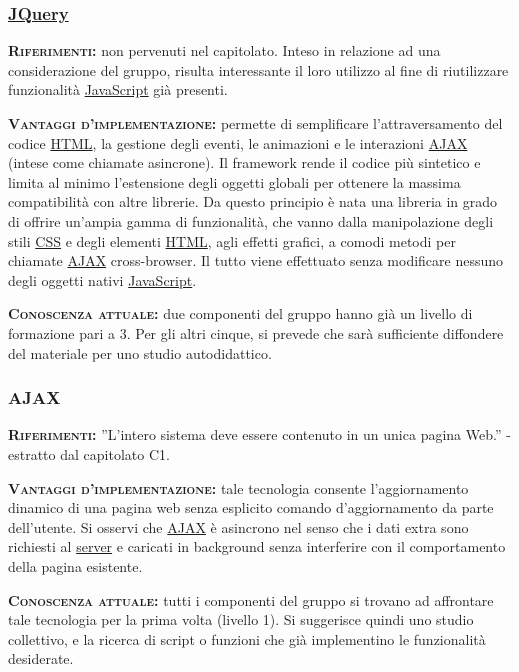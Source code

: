 \subsubsection{\underline{JQuery}}
\begin{description}
	\item{\scshape\bfseries Riferimenti:} non pervenuti nel capitolato. Inteso in relazione ad una considerazione del gruppo, risulta interessante il loro utilizzo al fine di riutilizzare funzionalità \underline{JavaScript} già presenti.
	
	\item{\scshape\bfseries Vantaggi d'implementazione:} permette di semplificare l'attraversamento del codice \underline{HTML}, la gestione degli eventi, le animazioni e le interazioni \underline{AJAX} (intese come chiamate asincrone). Il framework rende il codice più sintetico e limita al minimo l’estensione degli oggetti globali per ottenere la massima compatibilità con altre librerie. Da questo principio è nata una libreria in grado di offrire un'ampia gamma di funzionalità, che vanno dalla manipolazione degli stili \underline{CSS} e degli elementi \underline{HTML}, agli effetti grafici, a comodi metodi per chiamate \underline{AJAX} cross-browser. Il tutto viene effettuato senza modificare nessuno degli oggetti nativi \underline{JavaScript}.
	
	\item{\scshape\bfseries Conoscenza attuale:} due componenti del gruppo hanno già un livello di formazione pari a 3. Per gli altri cinque, si prevede che sarà sufficiente diffondere del materiale per uno studio autodidattico.
\end{description}

\subsubsection{AJAX}
\begin{description}
	\item{\scshape\bfseries Riferimenti:} ''L'intero sistema deve essere contenuto in un unica pagina Web.'' - estratto dal capitolato C1.

	\item{\scshape\bfseries Vantaggi d'implementazione:} tale tecnologia consente l'aggiornamento dinamico di una pagina web senza esplicito comando d'aggiornamento da parte dell'utente. Si osservi che \underline{AJAX} è asincrono nel senso che i dati extra sono richiesti al \underline{server} e caricati in background senza interferire con il comportamento della pagina esistente.
	
	\item{\scshape\bfseries Conoscenza attuale:} tutti i componenti del gruppo si trovano ad affrontare tale tecnologia per la prima volta (livello 1). Si suggerisce quindi uno studio collettivo, e la ricerca di script o funzioni che già implementino le funzionalità desiderate.
\end{description}


